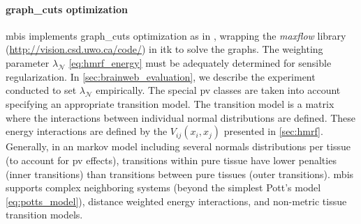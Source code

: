 \paragraph{\Acrlong*{graph_cuts} optimization}\label{par:graphcuts_optimization} %
\Gls*{mbis} implements \gls*{graph_cuts} optimization as in \citep{boykov_fast_2001},
  wrapping the \emph{maxflow} library (\url{http://vision.csd.uwo.ca/code/})
  in \gls*{itk} to solve the graphs.
The weighting parameter $\lambda_{\mathcal{N}}$ \eqref{eq:hmrf_energy} must be
  adequately determined for sensible regularization.
In \autoref{sec:brainweb_evaluation}, we describe the experiment conducted to
  set $\lambda_{\mathcal{N}}$ empirically.
The special \gls*{pv} classes are taken into account specifying an appropriate
  transition model.
The transition model is a matrix where the interactions between individual normal
  distributions are defined.
These energy interactions are defined by the $V_{ij}(x_{i},x_{j})$ presented in
  \autoref{sec:hmrf}.
Generally, in an \gls*{markov} model including several normals distributions per
  tissue (to account for \gls*{pv} effects), transitions within pure tissue have
  lower penalties (inner transitions) than transitions between pure tissues
  (outer transitions).
\Gls*{mbis} supports complex neighboring systems (beyond the simplest Pott's model
  \eqref{eq:potts_model}), distance weighted energy interactions, and non-metric
  tissue transition models.